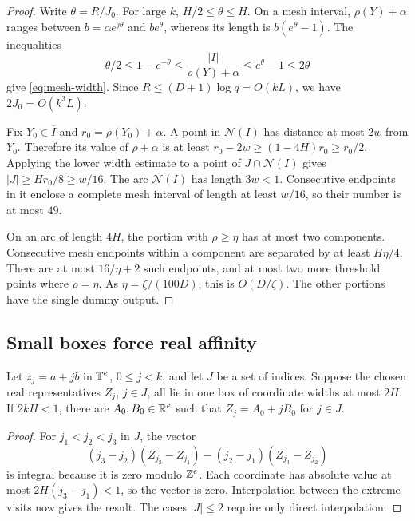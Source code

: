 \begin{proof}
Write \(\theta=R/J_0\). For large \(k\), \(H/2\le\theta\le H\).
On a mesh interval, \(\rho(Y)+\alpha\) ranges between
\(b=\alpha e^{j\theta}\) and \(be^\theta\), whereas its length is
\(b(e^\theta-1)\). The inequalities
\[
 \theta/2\le1-e^{-\theta}
 \le\frac{|I|}{\rho(Y)+\alpha}
 \le e^\theta-1\le2\theta
\]
give \eqref{eq:mesh-width}. Since
\(R\le(D+1)\log q=O(kL)\), we have \(2J_0=O(k^3L)\).

Fix \(Y_0\in\overline I\) and \(r_0=\rho(Y_0)+\alpha\).
A point in \(\mathcal N(I)\) has distance at most \(2w\) from \(Y_0\).
Therefore its value of \(\rho+\alpha\) is at least
\(r_0-2w\ge(1-4H)r_0\ge r_0/2\).
Applying the lower width estimate to a point of
\(\overline J\cap\mathcal N(I)\) gives
\(|J|\ge Hr_0/8\ge w/16\).
The arc \(\mathcal N(I)\) has length \(3w<1\).
Consecutive endpoints in it enclose a complete mesh interval of
length at least \(w/16\), so their number is at most \(49\).

On an arc of length \(4H\), the portion with \(\rho\ge\eta\) has at
most two components. Consecutive mesh endpoints within a component
are separated by at least \(H\eta/4\). There are at most
\(16/\eta+2\) such endpoints, and at most two more threshold points
where \(\rho=\eta\). As \(\eta=\zeta/(100D)\), this is
\(O(D/\zeta)\). The other portions have the single dummy output.
\end{proof}

\subsection{Small boxes force real affinity}

\begin{lemma}\label{lem:box-affine}
Let \(z_j=a+jb\) in \(\mathbb T^e\), \(0\le j<k\), and let \(J\) be a
set of indices. Suppose the chosen real representatives \(Z_j\),
\(j\in J\), all lie in one box of coordinate widths at most \(2H\).
If \(2kH<1\), there are \(A_0,B_0\in\mathbb R^e\) such that
\(Z_j=A_0+jB_0\) for \(j\in J\).
\end{lemma}

\begin{proof}
For \(j_1<j_2<j_3\) in \(J\), the vector
\[
 (j_3-j_2)(Z_{j_2}-Z_{j_1})
 -(j_2-j_1)(Z_{j_3}-Z_{j_2})
\]
is integral because it is zero modulo \(\mathbb Z^e\).
Each coordinate has absolute value at most
\(2H(j_3-j_1)<1\), so the vector is zero.
Interpolation between the extreme visits now gives the result.
The cases \(|J|\le2\) require only direct interpolation.
\end{proof}

